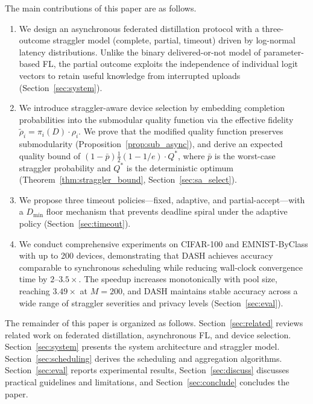 \documentclass[a4paper,fleqn]{cas-dc}
\begin{document}
	The main contributions of this paper are as follows.
	\begin{enumerate}
		\item We design an asynchronous federated distillation protocol with
		a three-outcome straggler model (complete, partial, timeout) driven
		by log-normal latency distributions.  Unlike the binary
		delivered-or-not model of parameter-based FL, the partial outcome
		exploits the independence of individual logit vectors to retain useful
		knowledge from interrupted uploads (Section~\ref{sec:system}).
		
		\item We introduce straggler-aware device selection by embedding
		completion probabilities into the submodular quality function via the
		effective fidelity $\tilde{\rho}_i = \pi_i(D) \cdot \rho_i$.  We
		prove that the modified quality function preserves submodularity
		(Proposition~\ref{prop:sub_async}), and derive an expected quality
		bound of
		$(1-\bar{p})\tfrac{1}{2}(1-1/e) \cdot Q^*$, where $\bar{p}$ is the
		worst-case straggler probability and $Q^*$ is the deterministic
		optimum (Theorem~\ref{thm:straggler_bound},
		Section~\ref{sec:sa_select}).
		
		\item We propose three timeout policies---fixed, adaptive, and
		partial-accept---with a $D_{\min}$ floor mechanism that prevents
		deadline spiral under the adaptive policy
		(Section~\ref{sec:timeout}).
		
		\item We conduct comprehensive experiments on CIFAR-100 and
		EMNIST-ByClass with up to 200 devices, demonstrating that DASH
		achieves accuracy comparable to synchronous scheduling while reducing
		wall-clock convergence time by $2$--$3.5\times$.  The speedup
		increases monotonically with pool size, reaching $3.49\times$ at
		$M = 200$, and DASH maintains stable accuracy across a wide range of
		straggler severities and privacy levels
		(Section~\ref{sec:eval}).
	\end{enumerate}
	
	The remainder of this paper is organized as follows.
	Section~\ref{sec:related} reviews related work on federated
	distillation, asynchronous FL, and device selection.
	Section~\ref{sec:system} presents the system architecture and
	straggler model.  Section~\ref{sec:scheduling} derives the scheduling
	and aggregation algorithms.  Section~\ref{sec:eval} reports
	experimental results, Section~\ref{sec:discuss} discusses practical
	guidelines and limitations, and Section~\ref{sec:conclude} concludes
	the paper.
	
\end{document}
